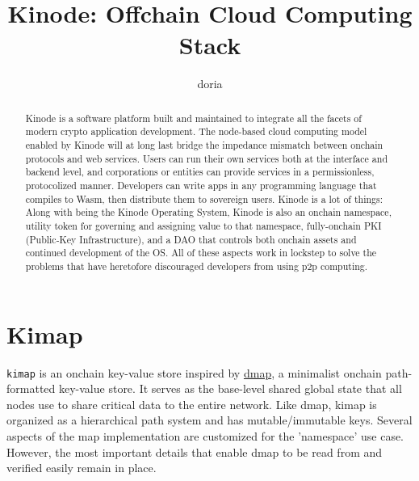 \documentclass[runningheads]{llncs}
\begin{document}
%
\title{Kinode: Offchain Cloud Computing Stack}
%
%
\author{doria %
}
%
%
\institute{ }
%
\maketitle              %
%
\begin{abstract}
Kinode is a software platform built and maintained to integrate all the facets of modern crypto application development.
The node-based cloud computing model enabled by Kinode will at long last bridge the impedance mismatch between onchain protocols and web services.
Users can run their own services both at the interface and backend level, and corporations or entities can provide services in a permissionless, protocolized manner.
Developers can write apps in any programming language that compiles to Wasm, then distribute them to sovereign users.
Kinode is a lot of things:
Along with being the Kinode Operating System, Kinode is also an onchain namespace, utility token for governing and assigning value to that namespace, fully-onchain PKI (Public-Key Infrastructure), and a DAO that controls both onchain assets and continued development of the OS.
All of these aspects work in lockstep to solve the problems that have heretofore discouraged developers from using p2p computing.

\end{abstract}
%
%
%
\tableofcontents
\newpage
%
%
%
\section{Kimap}
\verb|kimap| is an onchain key-value store inspired by \href{https://github.com/dapphub/dmap}{dmap}, a minimalist onchain path-formatted key-value store.
It serves as the base-level shared global state that all nodes use to share critical data to the entire network.
Like dmap, kimap is organized as a hierarchical path system and has mutable/immutable keys.
Several aspects of the map implementation are customized for the 'namespace' use case.
However, the most important details that enable dmap to be read from and verified easily remain in place.
\end{document}
